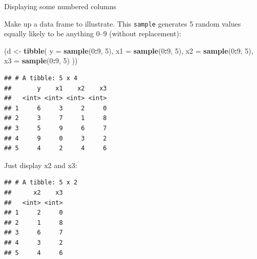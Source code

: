 \documentclass[
  ignorenonframetext,
]{beamer}
\newenvironment{Shaded}{\begin{snugshade}}{\end{snugshade}}
\newcommand{\DataTypeTok}[1]{\textcolor[rgb]{0.13,0.29,0.53}{#1}}
\newcommand{\DecValTok}[1]{\textcolor[rgb]{0.00,0.00,0.81}{#1}}
\newcommand{\KeywordTok}[1]{\textcolor[rgb]{0.13,0.29,0.53}{\textbf{#1}}}
\newcommand{\NormalTok}[1]{#1}
\newcommand{\OperatorTok}[1]{\textcolor[rgb]{0.81,0.36,0.00}{\textbf{#1}}}
\newcommand{\StringTok}[1]{\textcolor[rgb]{0.31,0.60,0.02}{#1}}
\begin{document}
\begin{frame}[fragile]{Displaying some numbered columns}
\protect\hypertarget{displaying-some-numbered-columns}{}

Make up a data frame to illustrate. This \texttt{sample} generates 5
random values equally likely to be anything 0--9 (without replacement):

\begin{Shaded}
\begin{Highlighting}[]
\NormalTok{(d <-}\StringTok{ }\KeywordTok{tibble}\NormalTok{(}
  \DataTypeTok{y =} \KeywordTok{sample}\NormalTok{(}\DecValTok{0}\OperatorTok{:}\DecValTok{9}\NormalTok{, }\DecValTok{5}\NormalTok{),}
  \DataTypeTok{x1 =} \KeywordTok{sample}\NormalTok{(}\DecValTok{0}\OperatorTok{:}\DecValTok{9}\NormalTok{, }\DecValTok{5}\NormalTok{),}
  \DataTypeTok{x2 =} \KeywordTok{sample}\NormalTok{(}\DecValTok{0}\OperatorTok{:}\DecValTok{9}\NormalTok{, }\DecValTok{5}\NormalTok{),}
  \DataTypeTok{x3 =} \KeywordTok{sample}\NormalTok{(}\DecValTok{0}\OperatorTok{:}\DecValTok{9}\NormalTok{, }\DecValTok{5}\NormalTok{)}
\NormalTok{))}
\end{Highlighting}
\end{Shaded}

\begin{verbatim}
## # A tibble: 5 x 4
##       y    x1    x2    x3
##   <int> <int> <int> <int>
## 1     6     3     2     0
## 2     3     7     1     8
## 3     5     9     6     7
## 4     9     0     3     2
## 5     4     2     4     6
\end{verbatim}

\end{frame}

\begin{frame}[fragile]{Just display x2 and x3:}
\protect\hypertarget{just-display-x2-and-x3}{}

\begin{Shaded}
\end{Shaded}

\begin{verbatim}
## # A tibble: 5 x 2
##      x2    x3
##   <int> <int>
## 1     2     0
## 2     1     8
## 3     6     7
## 4     3     2
## 5     4     6
\end{verbatim}

\end{frame}
\end{document}
